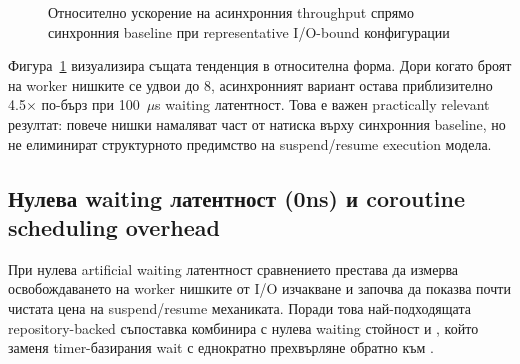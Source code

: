 \begin{figure}[H]
\centering
{}
\caption{Относително ускорение на асинхронния throughput спрямо синхронния baseline при representative I/O-bound конфигурации}
\label{fig:async_speedup_cases}
\end{figure}

Фигура~\ref{fig:async_speedup_cases} визуализира същата тенденция в относителна форма. Дори когато броят на worker нишките се удвои до 8, асинхронният вариант остава приблизително 4.5$\times$ по-бърз при 100~$\mu$s waiting латентност. Това е важен practically relevant резултат: повече нишки намаляват част от натиска върху синхронния baseline, но не елиминират структурното предимство на suspend/resume execution модела.

\subsection{Нулева waiting латентност (0ns) и coroutine scheduling overhead}

При нулева artificial waiting латентност сравнението престава да измерва освобождаването на worker нишките от I/O изчакване и започва да показва почти чистата цена на suspend/resume механиката. Поради това най-подходящата repository-backed съпоставка комбинира  с нулева waiting стойност и , който заменя timer-базирания wait с еднократно  прехвърляне обратно към .


